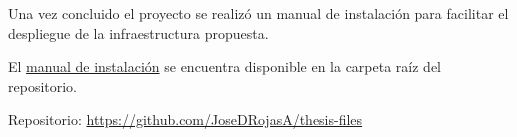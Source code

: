 \newpage
{}\label{appendix:Manual de instalacion}
Una vez concluido el proyecto se realiz\'o un manual de instalaci\'on para facilitar el despliegue de la infraestructura propuesta.

\noindent El \href{https://github.com/JoseDRojasA/thesis-files/raw/master/Manual de instalación.pdf}{manual de instalaci\'on} se encuentra disponible en la carpeta ra\'iz del repositorio.

\noindent Repositorio: \url{https://github.com/JoseDRojasA/thesis-files}
